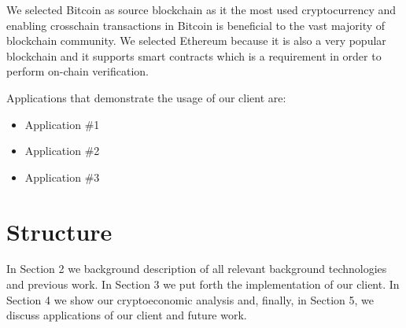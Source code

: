 We selected Bitcoin as source blockchain as it the most used cryptocurrency and
enabling crosschain transactions in Bitcoin is beneficial to the vast majority
of blockchain community. We selected Ethereum because it is also a very popular
blockchain and it supports smart contracts which is a requirement in order to
perform on-chain verification.

\bigbreak Applications that demonstrate the usage of our client are:

\begin{itemize}
    \item{Application \#1}
    \item{Application \#2}
    \item{Application \#3}
\end{itemize}

\section{Structure}

In Section 2 we background description of all relevant background
technologies and previous work. In Section 3 we put forth the implementation of
our client. In Section 4 we show our cryptoeconomic analysis and, finally, in
Section 5, we discuss applications of our client and future work.
